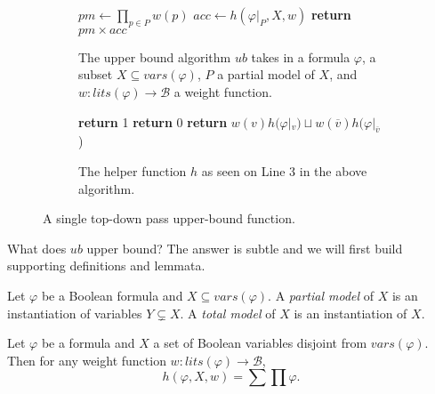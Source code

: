 \documentclass[acmsmall,review]{acmart}\settopmatter{printfolios=true,printccs=false,printacmref=false}
\begin{document}
\begin{figure}[H]
  \begin{subfigure}{1 \textwidth}
    \begin{mdframed}{\begin{algorithmic}[1]
      \State $pm \gets \prod_{p \in P} w(p)$ 
      \State $acc \gets h(\varphi|_P, X, w)$
      \State \textbf{return} $pm \times acc$
      \EndProcedure
    \end{algorithmic}}
    \end{mdframed}
    \caption{The upper bound algorithm $ub$ takes in a formula $\varphi$, a subset $X \subseteq vars(\varphi)$, $P$ a partial model of $X$, and $w : lits(\varphi) \to \mathcal B$ a weight function.}
    \label{ub algo}
  \end{subfigure}
  \begin{subfigure}{1 \textwidth}
    \begin{mdframed}{\begin{algorithmic}[1]
      \If {$\varphi = \top$} \textbf{return} 1
      \ElsIf {$\varphi = \bot$} \textbf{return} 0
          \textbf{return} $w(v)h(\varphi|_v) \sqcup w(\overline v)h(\varphi|_{\overline v}$)
        \EndIf
      \EndIf
      \EndProcedure
    \end{algorithmic}}
    \end{mdframed}
    \caption{The helper function $h$ as seen on Line 3 in the above algorithm.}
    \label{h algo}
  \end{subfigure}
  \caption{A single top-down pass upper-bound function.}
\end{figure}

What does $ub$ upper bound? The answer is subtle and we will first build supporting definitions and lemmata.

\begin{definition}
  Let $\varphi$ be a Boolean formula and $X \subseteq vars(\varphi)$. A \emph{partial model} of $X$ is an instantiation of variables $Y \subsetneq X$. A \emph{total model} of $X$ is an instantiation of $X$.
\end{definition}

\begin{lemma}\label{h invariant for total models}
  Let $\varphi$ be a formula and $X$ a set of Boolean variables disjoint from $vars(\varphi)$. Then for any weight function $w : lits(\varphi) \to \mathcal B$,
  \begin{equation}
    h(\varphi, X, w) = \sum\prod \varphi.
  \end{equation}
\end{lemma}
\end{document}
